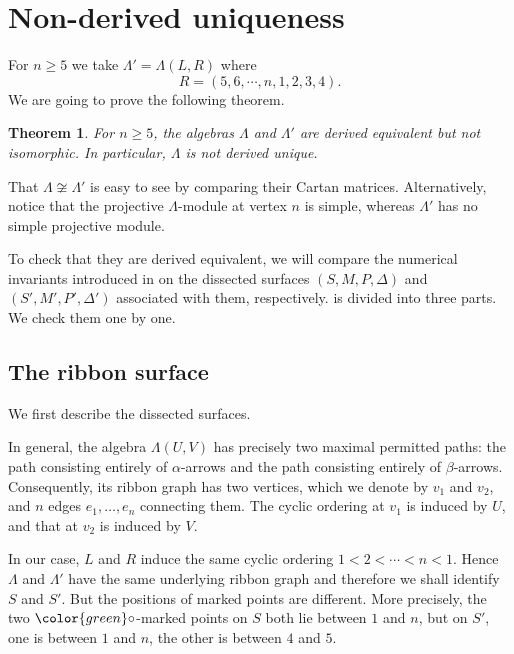 \documentclass[11pt,reqno]{amsart}
\theoremstyle{plain}
\newtheorem{theorem}{Theorem}[section]
\theoremstyle{definition}
\theoremstyle{remark}
\numberwithin{equation}{section}
\begin{document}
\section{Non-derived uniqueness}
\par For $n\geq5$ we take $\Lambda'=\Lambda(L,R)$ where
\[R=(5,6,\cdots,n,1,2,3,4).\]
We are going to prove the following theorem.
\begin{theorem}\label{thm:derived equivent}
    For $n\geq5$, the algebras $\Lambda$ and $\Lambda'$ are derived equivalent but not isomorphic. In particular, $\Lambda$ is not derived unique.
\end{theorem}
\par That $\Lambda\not\cong\Lambda'$ is easy to see by comparing their Cartan matrices. Alternatively, notice that the projective $\Lambda$-module at vertex $n$ is simple, whereas $\Lambda'$ has no simple projective module.
\par To check that they are derived equivalent, we will compare the numerical invariants introduced in \cite[Theorem 7.4]{APS} on the dissected surfaces $(S,M,P,\Delta)$ and $(S',M',P',\Delta')$ associated with them, respectively. \cite[Theorem 7.4]{APS} is divided into three parts. We check them one by one.

\subsection{The ribbon surface}
\par We first describe the dissected surfaces.
\par In general, the algebra $\Lambda(U,V)$ has precisely two maximal permitted paths: the path consisting entirely of $\alpha$-arrows and the path consisting entirely of $\beta$-arrows. Consequently, its ribbon graph has two vertices, which we denote by $v_1$ and $v_2$, and $n$ edges $e_1,\ldots,e_n$ connecting them. The cyclic ordering at $v_1$ is induced by $U$, and that at $v_2$ is induced by $V$.
\par In our case, $L$ and $R$ induce the same cyclic ordering $1<2<\cdots<n<1$. Hence $\Lambda$ and $\Lambda'$ have the same underlying ribbon graph and therefore we shall identify $S$ and $S'$. But the positions of marked points are different. More precisely, the two $\color{green}\circ$-marked points on $S$ both lie between $1$ and $n$, but on $S'$, one is between $1$ and $n$, the other is between $4$ and $5$.
\end{document}
